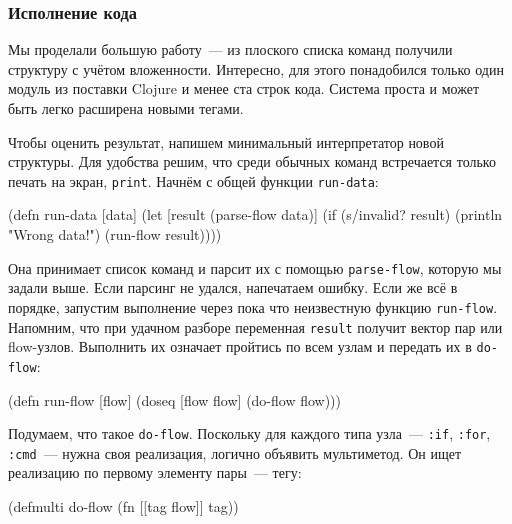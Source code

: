 \subsubsection{Исполнение кода}


Мы проделали большую работу~--- из плоского списка команд получили структуру с
учётом вложенности. Интересно, для этого понадобился только один модуль из
поставки Clojure и менее ста строк кода. Система проста и может быть легко
расширена новыми тегами.

Чтобы оценить результат, напишем минимальный интерпретатор новой структуры. Для
удобства решим, что среди обычных команд встречается только печать на экран,
\texttt{print}. Начнём с общей функции \texttt{run-data}:

\begin{english}
  \begin{clojure}
(defn run-data [data]
  (let [result (parse-flow data)]
    (if (s/invalid? result)
      (println "Wrong data!")
      (run-flow result))))
  \end{clojure}
\end{english}

Она принимает список команд и парсит их с помощью \texttt{parse-flow}, которую
мы задали выше. Если парсинг не удался, напечатаем ошибку. Если же всё в
порядке, запустим выполнение через пока что неизвестную функцию
\texttt{run-flow}. Напомним, что при удачном разборе переменная \texttt{result}
получит вектор пар или flow-узлов. Выполнить их означает пройтись по всем узлам
и передать их в \texttt{do-flow}:

\begin{english}
  \begin{clojure}
(defn run-flow [flow]
  (doseq [flow flow]
    (do-flow flow)))
  \end{clojure}
\end{english}

Подумаем, что такое \texttt{do-flow}. Поскольку для каждого типа узла~---
\verb|:if|, \verb|:for|, \verb|:cmd|~--- нужна своя реализация, логично объявить
мультиметод. Он ищет реализацию по первому элементу пары~--- тегу:

\begin{english}
  \begin{clojure}
(defmulti do-flow
  (fn [[tag flow]]
    tag))
  \end{clojure}
\end{english}

